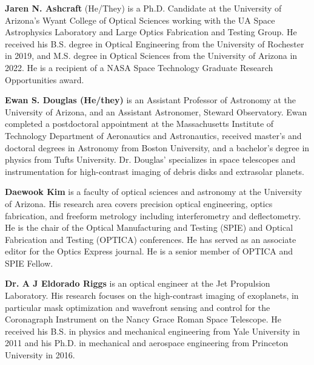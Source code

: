 \documentclass[12pt]{spieman}  %
\begin{document}
\begin{spacing}{2}
\vspace{2ex}\noindent\textbf{Jaren N. Ashcraft} (He/They) is a Ph.D. Candidate at the University of Arizona's Wyant College of Optical Sciences working with the UA Space Astrophysics Laboratory and Large Optics Fabrication and Testing Group. He received his B.S. degree in Optical Engineering from the University of Rochester in 2019, and M.S. degree in Optical Sciences from the University of Arizona in 2022. He is a recipient of a NASA Space Technology Graduate Research Opportunities award.


\vspace{2ex}\noindent\textbf{Ewan S. Douglas (He/they)}  is an Assistant Professor of Astronomy at the University of Arizona, and an Assistant Astronomer, Steward Observatory. Ewan completed a postdoctoral appointment at the Massachusetts Institute of Technology Department of Aeronautics and Astronautics, received master's and doctoral degrees in Astronomy from Boston University, and a bachelor's degree in physics from Tufts University.  Dr. Douglas' specializes in space telescopes and instrumentation for high-contrast imaging of debris disks and extrasolar planets.

\vspace{2ex}\noindent\textbf{Daewook Kim} is a faculty of optical sciences and astronomy at the University of Arizona. His research area covers precision optical engineering, optics fabrication, and freeform metrology including interferometry and deflectometry. He is the chair of the Optical Manufacturing and Testing (SPIE) and Optical Fabrication and Testing (OPTICA) conferences. He has served as an associate editor for the Optics Express journal. He is a senior member of OPTICA and SPIE Fellow.

\vspace{2ex}\noindent\textbf{Dr. A J Eldorado Riggs} is an optical engineer at the Jet Propulsion Laboratory. His research focuses on the high-contrast imaging of exoplanets, in particular mask optimization and wavefront sensing and control for the Coronagraph Instrument on the Nancy Grace Roman Space Telescope. He received his B.S. in physics and mechanical engineering from Yale University in 2011 and his Ph.D. in mechanical and aerospace engineering from Princeton University in 2016.


\vspace{1ex}


\end{spacing}
\end{document}
